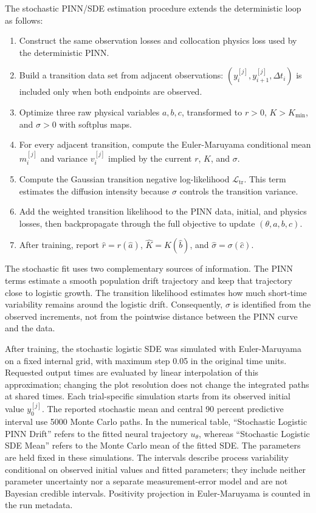 The stochastic PINN/SDE estimation procedure extends the deterministic loop as
follows:
\begin{enumerate}
  \item Construct the same observation losses and collocation physics loss used
        by the deterministic PINN.
  \item Build a transition data set from adjacent observations:
        $(y_i^{[j]},y_{i+1}^{[j]},\Delta t_i)$ is included only when both
        endpoints are observed.
  \item Optimize three raw physical variables $a,b,c$, transformed to
        $r>0$, $K>K_{\min}$, and $\sigma>0$ with softplus maps.
  \item For every adjacent transition, compute the Euler-Maruyama conditional
        mean $m_i^{[j]}$ and variance $v_i^{[j]}$ implied by the current
        $r$, $K$, and $\sigma$.
  \item Compute the Gaussian transition negative log-likelihood
        $\mathcal L_{\mathrm{tr}}$. This term estimates the diffusion
        intensity because $\sigma$ controls the transition variance.
  \item Add the weighted transition likelihood to the PINN data, initial, and
        physics losses, then backpropagate through the full objective to update
        $(\theta,a,b,c)$.
  \item After training, report
        $\widehat r=r(\widehat a)$,
        $\widehat K=K(\widehat b)$, and
        $\widehat\sigma=\sigma(\widehat c)$.
\end{enumerate}

The stochastic fit uses two complementary sources of information. The PINN
terms estimate a smooth population drift trajectory and keep that trajectory
close to logistic growth. The transition likelihood estimates how much
short-time variability remains around the logistic drift. Consequently,
$\sigma$ is identified from the observed increments, not from the pointwise
distance between the PINN curve and the data.

After training, the stochastic logistic SDE was simulated with
Euler-Maruyama on a fixed internal grid, with maximum step 0.05 in the
original time units. Requested output times are evaluated by linear
interpolation of this approximation; changing the plot resolution does not
change the integrated paths at shared times. Each trial-specific simulation starts from its observed initial
value $y_0^{[j]}$. The reported stochastic mean and central 90 percent
predictive interval use 5000 Monte Carlo paths. In the numerical table,
``Stochastic Logistic PINN Drift'' refers to the fitted neural trajectory
$u_\theta$, whereas ``Stochastic Logistic SDE Mean'' refers to the Monte Carlo
mean of the fitted SDE.
The parameters are held fixed in these simulations. The intervals describe
process variability conditional on observed initial values and fitted
parameters; they include neither parameter uncertainty nor a separate
measurement-error model and are not Bayesian credible intervals. Positivity
projection in Euler-Maruyama is counted in the run metadata.
